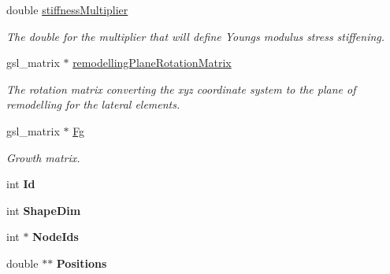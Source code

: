 \begin{DoxyCompactItemize}
\item 
\hypertarget{classShapeBase_a9cff4a8549b3399fec12309d18b6db70}{}double \hyperlink{classShapeBase_a9cff4a8549b3399fec12309d18b6db70}{stiffness\+Multiplier}\label{classShapeBase_a9cff4a8549b3399fec12309d18b6db70}

\begin{DoxyCompactList}\small\item\em The double for the multiplier that will define Young\textquotesingle{}s modulus stress stiffening. \end{DoxyCompactList}\item 
\hypertarget{classShapeBase_a0e8b443e4b55479a9d2a7a7eacd62b69}{}gsl\+\_\+matrix $\ast$ \hyperlink{classShapeBase_a0e8b443e4b55479a9d2a7a7eacd62b69}{remodelling\+Plane\+Rotation\+Matrix}\label{classShapeBase_a0e8b443e4b55479a9d2a7a7eacd62b69}

\begin{DoxyCompactList}\small\item\em The rotation matrix converting the xyz coordinate system to the plane of remodelling for the lateral elements. \end{DoxyCompactList}\item 
\hypertarget{classShapeBase_a4156d7c7f91f0b528214b74277279df0}{}gsl\+\_\+matrix $\ast$ \hyperlink{classShapeBase_a4156d7c7f91f0b528214b74277279df0}{Fg}\label{classShapeBase_a4156d7c7f91f0b528214b74277279df0}

\begin{DoxyCompactList}\small\item\em Growth matrix. \end{DoxyCompactList}\item 
\hypertarget{classShapeBase_ae097764dd4d607b54710d7ca0f7e12f8}{}int {\bfseries Id}\label{classShapeBase_ae097764dd4d607b54710d7ca0f7e12f8}

\item 
\hypertarget{classShapeBase_a4d740b60433d7a9104c2d09b0d52703d}{}int {\bfseries Shape\+Dim}\label{classShapeBase_a4d740b60433d7a9104c2d09b0d52703d}

\item 
\hypertarget{classShapeBase_a870e519202c84ef5a81fd35b059fdebe}{}int $\ast$ {\bfseries Node\+Ids}\label{classShapeBase_a870e519202c84ef5a81fd35b059fdebe}

\item 
\hypertarget{classShapeBase_ad6aa109b1f9c10680a0b601452bc78c2}{}double $\ast$$\ast$ {\bfseries Positions}\label{classShapeBase_ad6aa109b1f9c10680a0b601452bc78c2}


\end{DoxyCompactItemize}
